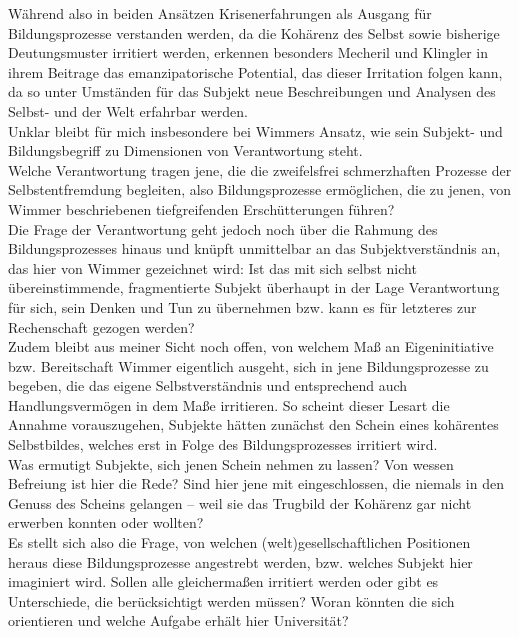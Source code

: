 \noindent Während also in beiden Ansätzen
Krisenerfahrungen als Ausgang für Bildungsprozesse verstanden werden, da die
Kohärenz des Selbst sowie bisherige Deutungsmuster irritiert werden, erkennen
besonders Mecheril und Klingler in ihrem Beitrage das emanzipatorische
Potential, das dieser Irritation folgen kann, da so unter Umständen für das
Subjekt neue Beschreibungen und Analysen des Selbst- und der Welt erfahrbar
werden.\\ 

\noindent Unklar bleibt für mich insbesondere bei Wimmers Ansatz, wie sein
Subjekt- und Bildungsbegriff zu Dimensionen von Verantwortung steht.\\
Welche
Verantwortung tragen jene, die die zweifelsfrei schmerzhaften Prozesse der
Selbstentfremdung begleiten, also Bildungsprozesse ermöglichen, die zu jenen,
von Wimmer beschriebenen tiefgreifenden Erschütterungen führen?\\
Die Frage der
Verantwortung geht jedoch noch über die Rahmung des Bildungsprozesses hinaus
und knüpft unmittelbar an das Subjektverständnis an, das hier von Wimmer
gezeichnet wird:
Ist das mit sich selbst nicht übereinstimmende, fragmentierte
Subjekt überhaupt in der Lage Verantwortung für sich, sein Denken und Tun zu
übernehmen bzw. kann es für letzteres zur Rechenschaft gezogen werden?\\
Zudem
bleibt aus meiner Sicht noch offen, von welchem Maß an Eigeninitiative bzw.
Bereitschaft Wimmer eigentlich ausgeht, sich in jene Bildungsprozesse zu
begeben, die das eigene Selbstverständnis und entsprechend auch
Handlungsvermögen in dem Maße irritieren. So scheint dieser Lesart die Annahme
vorauszugehen, Subjekte hätten zunächst den Schein eines kohärentes
Selbstbildes, welches erst in Folge des Bildungsprozesses irritiert wird.\\
Was
ermutigt Subjekte, sich jenen Schein nehmen zu lassen? Von wessen Befreiung ist
hier die Rede? Sind hier jene mit eingeschlossen, die niemals in den Genuss des
Scheins gelangen – weil sie das Trugbild der Kohärenz gar nicht erwerben
konnten oder wollten?\\

\noindent Es stellt sich also die Frage, von welchen
(welt)gesellschaftlichen Positionen heraus diese Bildungsprozesse angestrebt
werden, bzw. welches Subjekt hier imaginiert wird. Sollen alle gleichermaßen
irritiert werden oder gibt es Unterschiede, die berücksichtigt werden müssen?
Woran könnten die sich orientieren und welche Aufgabe erhält hier Universität?\\

